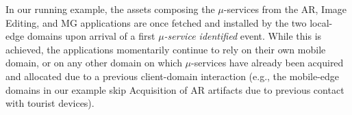 In our running example, the assets composing the $\mu$-services from the AR, Image Editing, and MG applications are once fetched and installed by the two local-edge domains upon arrival of a first \textit{$\mu$-service identified} event. While this is achieved, the applications momentarily continue to rely on their own mobile domain, or on any other domain on which $\mu$-services have already been acquired and allocated due to a previous client-domain interaction (e.g., the mobile-edge domains in our example skip Acquisition of AR artifacts due to previous contact with tourist devices).

%
%
%	
%	
%	
%	




